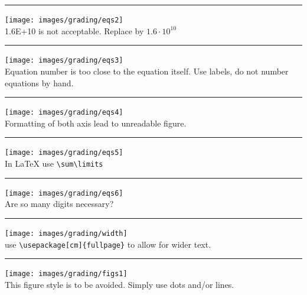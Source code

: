 \par\noindent\rule{\textwidth}{0.4pt}
\begin{center}
\texttt{[image: images/grading/eqs2]}\\
1.6E+10 is not acceptable. Replace by $1.6\cdot 10^{10}$
\end{center}

\par\noindent\rule{\textwidth}{0.4pt}
\begin{center}
\texttt{[image: images/grading/eqs3]}\\
Equation number is too close to the equation itself. Use labels, 
do not number equations by hand.
\end{center}

\par\noindent\rule{\textwidth}{0.4pt}
\begin{center}
\texttt{[image: images/grading/eqs4]}\\
Formatting of both axis lead to unreadable figure.
\end{center}

\par\noindent\rule{\textwidth}{0.4pt}
\begin{center}
\texttt{[image: images/grading/eqs5]}\\
In \LaTeX{}  use \verb!\sum\limits!
\end{center}

\par\noindent\rule{\textwidth}{0.4pt}
\begin{center}
\texttt{[image: images/grading/eqs6]}\\
Are so many digits necessary?
\end{center}

\par\noindent\rule{\textwidth}{0.4pt}
\begin{center}
\texttt{[image: images/grading/width]}\\
use \verb!\usepackage[cm]{fullpage}! to allow for wider text.
\end{center}

\par\noindent\rule{\textwidth}{0.4pt}
\begin{center}
\texttt{[image: images/grading/figs1]}\\
This figure style is to be avoided. Simply use dots and/or lines.
\end{center}

